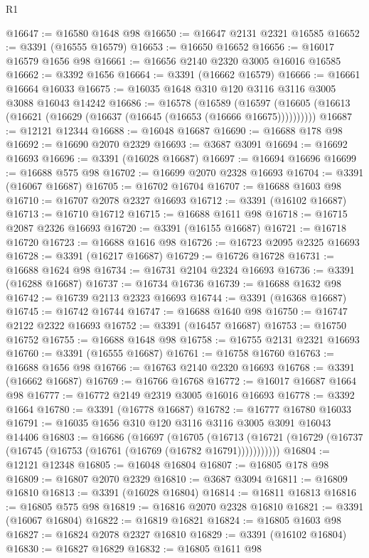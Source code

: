 \begin{lexlean}{R1}
\begin{coremodule}
@16647 := @16580 @1648 @98
@16650 := @16647 @2131 @2321 @16585
@16652 := @3391 (@16555 @16579)
@16653 := @16650 @16652
@16656 := @16017 @16579 @1656 @98
@16661 := @16656 @2140 @2320 @3005 @16016 @16585
@16662 := @3392 @1656
@16664 := @3391 (@16662 @16579)
@16666 := @16661 @16664 @16033
@16675 := @16035 @1648 @310 @120 @3116 @3116 @3005 @3088 @16043 @14242
@16686 := @16578
    (@16589 (@16597 (@16605 (@16613 (@16621 (@16629 (@16637 (@16645 (@16653 (@16666 @16675))))))))))
@16687 := @12121 @12344
@16688 := @16048 @16687
@16690 := @16688 @178 @98
@16692 := @16690 @2070 @2329
@16693 := @3687 @3091
@16694 := @16692 @16693
@16696 := @3391 (@16028 @16687)
@16697 := @16694 @16696
@16699 := @16688 @575 @98
@16702 := @16699 @2070 @2328 @16693
@16704 := @3391 (@16067 @16687)
@16705 := @16702 @16704
@16707 := @16688 @1603 @98
@16710 := @16707 @2078 @2327 @16693
@16712 := @3391 (@16102 @16687)
@16713 := @16710 @16712
@16715 := @16688 @1611 @98
@16718 := @16715 @2087 @2326 @16693
@16720 := @3391 (@16155 @16687)
@16721 := @16718 @16720
@16723 := @16688 @1616 @98
@16726 := @16723 @2095 @2325 @16693
@16728 := @3391 (@16217 @16687)
@16729 := @16726 @16728
@16731 := @16688 @1624 @98
@16734 := @16731 @2104 @2324 @16693
@16736 := @3391 (@16288 @16687)
@16737 := @16734 @16736
@16739 := @16688 @1632 @98
@16742 := @16739 @2113 @2323 @16693
@16744 := @3391 (@16368 @16687)
@16745 := @16742 @16744
@16747 := @16688 @1640 @98
@16750 := @16747 @2122 @2322 @16693
@16752 := @3391 (@16457 @16687)
@16753 := @16750 @16752
@16755 := @16688 @1648 @98
@16758 := @16755 @2131 @2321 @16693
@16760 := @3391 (@16555 @16687)
@16761 := @16758 @16760
@16763 := @16688 @1656 @98
@16766 := @16763 @2140 @2320 @16693
@16768 := @3391 (@16662 @16687)
@16769 := @16766 @16768
@16772 := @16017 @16687 @1664 @98
@16777 := @16772 @2149 @2319 @3005 @16016 @16693
@16778 := @3392 @1664
@16780 := @3391 (@16778 @16687)
@16782 := @16777 @16780 @16033
@16791 := @16035 @1656 @310 @120 @3116 @3116 @3005 @3091 @16043 @14406
@16803 := @16686
    (@16697
      (@16705
        (@16713 (@16721 (@16729 (@16737 (@16745 (@16753 (@16761 (@16769 (@16782 @16791)))))))))))
@16804 := @12121 @12348
@16805 := @16048 @16804
@16807 := @16805 @178 @98
@16809 := @16807 @2070 @2329
@16810 := @3687 @3094
@16811 := @16809 @16810
@16813 := @3391 (@16028 @16804)
@16814 := @16811 @16813
@16816 := @16805 @575 @98
@16819 := @16816 @2070 @2328 @16810
@16821 := @3391 (@16067 @16804)
@16822 := @16819 @16821
@16824 := @16805 @1603 @98
@16827 := @16824 @2078 @2327 @16810
@16829 := @3391 (@16102 @16804)
@16830 := @16827 @16829
@16832 := @16805 @1611 @98

\end{coremodule}
\end{lexlean}
